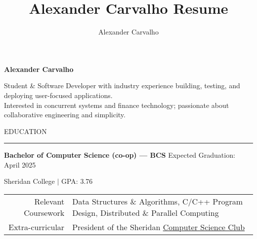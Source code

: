 \documentclass[9pt]{extarticle}
\title{Alexander Carvalho Resume}
\author{Alexander Carvalho}
\begin{document}
\color{regtextgray}


\begin{center}
	\textcolor{imptextblack}{\textbf{\fontsize{19}{0}\selectfont Alexander Carvalho}}

%

	\vspace{5pt}	

	Student \& Software Developer with industry experience building, testing, and deploying user-focused applications.  \\
	Interested in concurrent systems and finance technology; passionate about collaborative engineering and simplicity.
\end{center}


\begin{adjustwidth}{4pt}{4pt} \large \textrm{EDUCATION} \end{adjustwidth}
\rule[8pt]{\linewidth}{0.4pt}

\begin{adjustwidth}{10pt}{10pt}
	\vspace{-5pt}	

	\textcolor{imptextblack}{\textbf{\large Bachelor of Computer Science (co-op) — BCS}} \hfill Expected Graduation: April 2025
	
	Sheridan College $|$ {\small GPA: 3.76}
	
	\begin{adjustwidth}{18pt}{18pt}
		\begin{tabular}{ r l }
		 	\textcolor{imptextblack}{Relevant Coursework} & Data Structures \& Algorithms, C/C++ Program Design, Distributed \& Parallel Computing \\ 
			\textcolor{imptextblack}{Extra-curricular} & President of the Sheridan \href{https://sheridancollege.campuslabs.ca/engage/organization/mobilecomputingclub}{Computer Science Club} \\
		\end{tabular}
	\end{adjustwidth}
\end{adjustwidth}
\end{document}
